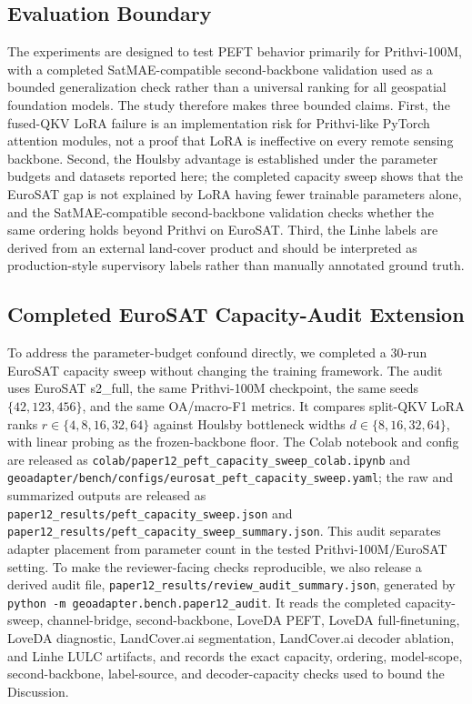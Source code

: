 \documentclass[11pt]{article}
\begin{document}
\subsection{Evaluation Boundary}
The experiments are designed to test PEFT behavior primarily for Prithvi-100M, with a completed SatMAE-compatible second-backbone validation used as a bounded generalization check rather than a universal ranking for all geospatial foundation models. The study therefore makes three bounded claims. First, the fused-QKV LoRA failure is an implementation risk for Prithvi-like PyTorch attention modules, not a proof that LoRA is ineffective on every remote sensing backbone. Second, the Houlsby advantage is established under the parameter budgets and datasets reported here; the completed capacity sweep shows that the EuroSAT gap is not explained by LoRA having fewer trainable parameters alone, and the SatMAE-compatible second-backbone validation checks whether the same ordering holds beyond Prithvi on EuroSAT. Third, the Linhe labels are derived from an external land-cover product and should be interpreted as production-style supervisory labels rather than manually annotated ground truth.

\subsection{Completed EuroSAT Capacity-Audit Extension}
To address the parameter-budget confound directly, we completed a 30-run EuroSAT capacity sweep without changing the training framework. The audit uses EuroSAT s2\_full, the same Prithvi-100M checkpoint, the same seeds $\{42,123,456\}$, and the same OA/macro-F1 metrics. It compares split-QKV LoRA ranks $r\in\{4,8,16,32,64\}$ against Houlsby bottleneck widths $d\in\{8,16,32,64\}$, with linear probing as the frozen-backbone floor. The Colab notebook and config are released as \texttt{colab/paper12\_peft\_capacity\_sweep\_colab.ipynb} and \texttt{geoadapter/bench/configs/eurosat\_peft\_capacity\_sweep.yaml}; the raw and summarized outputs are released as \texttt{paper12\_results/peft\_capacity\_sweep.json} and \texttt{paper12\_results/peft\_capacity\_sweep\_summary.json}. This audit separates adapter placement from parameter count in the tested Prithvi-100M/EuroSAT setting. To make the reviewer-facing checks reproducible, we also release a derived audit file, \texttt{paper12\_results/review\_audit\_summary.json}, generated by \texttt{python -m geoadapter.bench.paper12\_audit}. It reads the completed capacity-sweep, channel-bridge, second-backbone, LoveDA PEFT, LoveDA full-finetuning, LoveDA diagnostic, LandCover.ai segmentation, LandCover.ai decoder ablation, and Linhe LULC artifacts, and records the exact capacity, ordering, model-scope, second-backbone, label-source, and decoder-capacity checks used to bound the Discussion.
\end{document}
